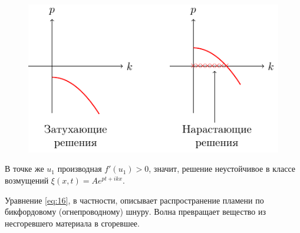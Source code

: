 \begin{figure}[H]
	\centering
	\includegraphics[scale=1.5]{img/osci_and_wave_in_ordered_struct/stability_or_instability} 
\end{figure}

В точке же $u_1$  производная $f'(u_1)>0$, значит, решение неустойчивое в классе возмущений $\xi(x,t)=A e^{pt+ikx}$.

Уравнение \eqref{eq:16}, в частности, описывает распространение пламени по бикфордовому (огнепроводному) шнуру. Волна превращает вещество из несгоревшего материала в сгоревшее.